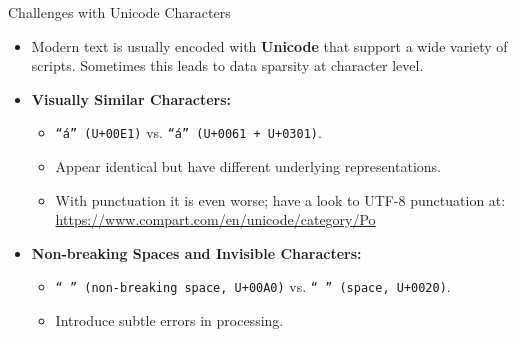 \documentclass{beamer}
\begin{document}
\begin{frame}{Challenges with Unicode Characters}
    \begin{itemize}
        \item Modern text is usually encoded with \textbf{Unicode} that support a wide variety of scripts. Sometimes this leads to data sparsity at character level.
        \item \textbf{Visually Similar Characters:}
        \begin{itemize}
            \item \texttt{“á” (U+00E1)} vs. \texttt{“á” (U+0061 + U+0301)}.
            \item Appear identical but have different underlying representations.
            \item With punctuation it is even worse; have a look to UTF-8 punctuation at: \url{https://www.compart.com/en/unicode/category/Po}
        \end{itemize}
        \item \textbf{Non-breaking Spaces and Invisible Characters:}
        \begin{itemize}
            \item \texttt{“ ” (non-breaking space, U+00A0)} vs. \texttt{“ ” (space, U+0020)}.
            \item Introduce subtle errors in processing.
        \end{itemize}
    \end{itemize}
\end{frame}
\end{document}
